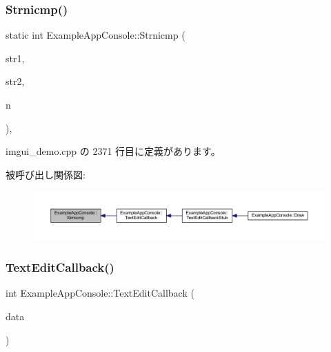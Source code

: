 \subsubsection{\texorpdfstring{Strnicmp()}{Strnicmp()}}
{\footnotesize\ttfamily static int Example\+App\+Console\+::\+Strnicmp (\begin{DoxyParamCaption}\item[{const char $\ast$}]{str1,  }\item[{const char $\ast$}]{str2,  }\item[{int}]{n }\end{DoxyParamCaption})\hspace{0.3cm}{\ttfamily [inline]}, {\ttfamily [static]}}



 imgui\+\_\+demo.\+cpp の 2371 行目に定義があります。

被呼び出し関係図\+:\nopagebreak
\begin{figure}[H]
\begin{center}
\leavevmode
\includegraphics[width=350pt]{struct_example_app_console_a11bcb7a4b801e5eeb0c098c082fedc25_icgraph}
\end{center}
\end{figure}
\mbox{\label{struct_example_app_console_aae97c81ddab660e6e0296c21844c4a7b}} 
\subsubsection{\texorpdfstring{Text\+Edit\+Callback()}{TextEditCallback()}}
{\footnotesize\ttfamily int Example\+App\+Console\+::\+Text\+Edit\+Callback (\begin{DoxyParamCaption}\item[{\mbox{\hyperlink{struct_im_gui_text_edit_callback_data}{Im\+Gui\+Text\+Edit\+Callback\+Data}} $\ast$}]{data }\end{DoxyParamCaption})\hspace{0.3cm}{\ttfamily [inline]}}



